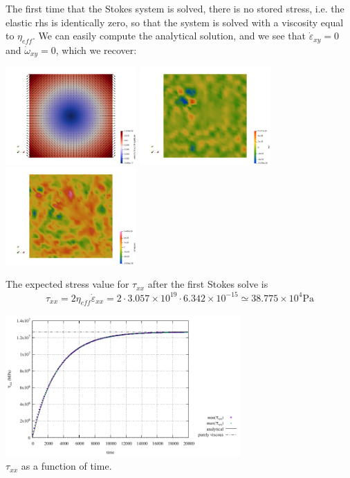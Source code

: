 The first time that the Stokes system is solved, there is no stored stress, i.e. the 
elastic rhs is identically zero, so that the system is solved with a viscosity equal to
$\eta_{eff}$.
We can easily compute the analytical solution, and we see that $\dot{\varepsilon}_{xy}=0$
and $\dot{\omega}_{xy}=0$, which we recover:

\begin{center}
\includegraphics[width=5cm]{python_codes/fieldstone_64/results/buildup_11/init/vel}
\includegraphics[width=5cm]{python_codes/fieldstone_64/results/buildup_11/init/exy}
\includegraphics[width=5cm]{python_codes/fieldstone_64/results/buildup_11/init/oxy}
\end{center}

The expected stress value for $\tau_{xx}$ after the first Stokes solve is 
\[
\tau_{xx} = 2 \eta_{eff} \dot{\varepsilon}_{xx} 
= 2 \cdot 3.057\times 10^{19} \cdot 6.342\times 10^{-15} 
\simeq 38.775 \times 10^4 \text{Pa}
\]

\begin{center}
\includegraphics[width=9cm]{python_codes/fieldstone_64/results/buildup_11/tauxx}\\
{\captionfont $\tau_{xx}$ as a function of time.}
\end{center}

